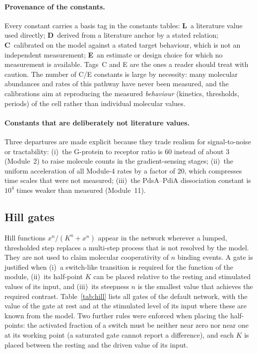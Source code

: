 \paragraph{Provenance of the constants.}
Every constant carries a basis tag in the constants tables:
\textbf{L}~a literature value used directly;
\textbf{D}~derived from a literature anchor by a stated relation;
\textbf{C}~calibrated on the model against a stated target behaviour, which is not an independent measurement;
\textbf{E}~an estimate or design choice for which no measurement is available.
Tags~C and E are the ones a reader should treat with caution.
The number of C/E constants is large by necessity: many molecular abundances and rates of this pathway have never been measured, and the calibrations aim at reproducing the measured \emph{behaviour} (kinetics, thresholds, periods) of the cell rather than individual molecular values.

\paragraph{Constants that are deliberately not literature values.}
Three departures are made explicit because they trade realism for signal-to-noise or tractability:
(i)~the G-protein to receptor ratio is 60 instead of about 3 (Module~2) to raise molecule counts in the gradient-sensing stages;
(ii)~the uniform acceleration of all Module-4 rates by a factor of 20, which compresses time scales that were not measured;
(iii)~the PdsA--PdiA dissociation constant is $10^4$ times weaker than measured (Module~11).

\subsection{Hill gates}\label{sec:hill}

Hill functions $x^n/(K^n+x^n)$ appear in the network wherever a lumped, thresholded step replaces a multi-step process that is not resolved by the model.
They are not used to claim molecular cooperativity of $n$ binding events.
A gate is justified when (i)~a switch-like transition is required for the function of the module, (ii)~its half-point $K$ can be placed relative to the resting and stimulated values of its input, and (iii)~its steepness $n$ is the smallest value that achieves the required contrast.
Table~\ref{tab:hill} lists all gates of the default network, with the value of the gate at rest and at the stimulated level of its input where these are known from the model.
Two further rules were enforced when placing the half-points: the activated fraction of a switch must be neither near zero nor near one at its working point (a saturated gate cannot report a difference), and each $K$ is placed between the resting and the driven value of its input.


